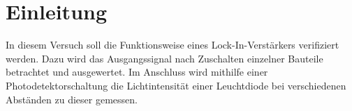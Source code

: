 
\section{Einleitung}
In diesem Versuch soll die Funktionsweise eines Lock-In-Verstärkers
verifiziert werden. Dazu wird das Ausgangssignal nach Zuschalten
einzelner Bauteile betrachtet und ausgewertet. Im Anschluss wird
mithilfe einer Photodetektorschaltung die Lichtintensität einer Leuchtdiode bei verschiedenen Abständen zu dieser gemessen.
